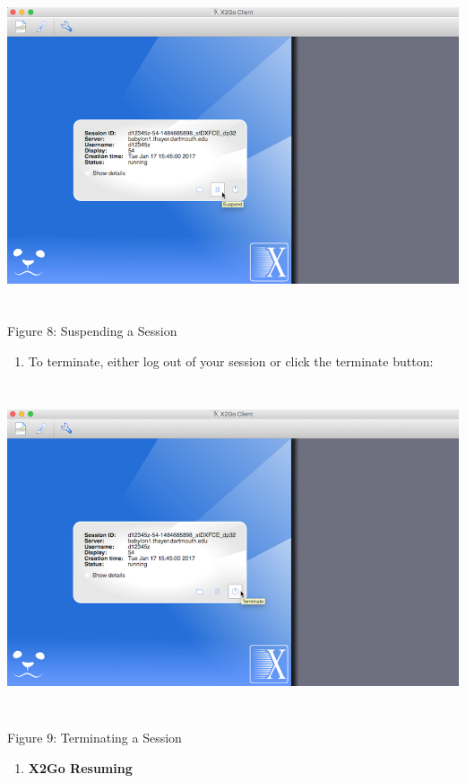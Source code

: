 \documentclass{article}
\begin{document}
\includegraphics[width=6.08268in,height=3.71654in]{images/media/image8.png}

Figure 8: Suspending a Session

\begin{enumerate}
\def\labelenumi{\arabic{enumi}.}
\setcounter{enumi}{13}
\item
  To terminate, either log out of your session or click the terminate
  button:
\end{enumerate}

\includegraphics[width=6.26806in,height=3.82311in]{images/media/image9.png}

Figure 9: Terminating a Session

\begin{enumerate}
\def\labelenumi{\Alph{enumi}.}
\setcounter{enumi}{4}
\item
  \textbf{X2Go Resuming}
\end{enumerate}
\end{document}
